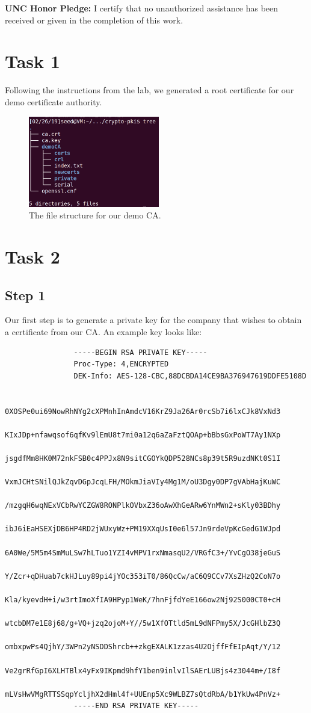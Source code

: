 \documentclass[12pt,letterpaper]{article}
\author{Chathan Driehuys}
\begin{document}
	\noindent \textbf{UNC Honor Pledge:} I certify that no unauthorized assistance has been received or given in the completion of this work.
	
	\vspace{.5in}
	
	\section*{Task 1}
		Following the instructions from the lab, we generated a root certificate for our demo certificate authority.
	
		\begin{figure}[h!]
			\begin{center}
				\includegraphics[width=2.25in]{task-1-files}
			\end{center}
			\caption{The file structure for our demo CA.}
		\end{figure}
	
	\section*{Task 2}
		\subsection*{Step 1}
			Our first step is to generate a private key for the company that wishes to obtain a certificate from our CA. An example key looks like:
			
			\begin{verbatim}
				-----BEGIN RSA PRIVATE KEY-----
				Proc-Type: 4,ENCRYPTED
				DEK-Info: AES-128-CBC,88DCBDA14CE9BA376947619DDFE5108D
				
				0XOSPe0ui69NowRhNYg2cXPMnhInAmdcV16KrZ9Ja26Ar0rcSb7i6lxCJk8VxNd3
				KIxJDp+nfawqsof6qfKv9lEmU8t7mi0a12q6aZaFztQOAp+bBbsGxPoWT7Ay1NXp
				jsgdfMm8HK0M72nkFSB0c4PPJx8N9sitCGOYkQDP528NCs8p39t5R9uzdNKt0S1I
				VxmJCHtSNilQJkZqvDGpJcqLFH/MOkmJiaVIy4Mg1M/oU3Dgy0DP7gVAbHajKuWC
				/mzgqH6wqNExVCbRwYCZGW8RONPlkOVbxZ36oAwXhGeARw6YnMWn2+sKly03BDhy
				ibJ6iEaHSEXjDB6HP4RD2jWUxyWz+PM19XXqUsI0e6l57Jn9rdeVpKcGedG1WJpd
				6A0We/5M5m4SmMuLSw7hLTuo1YZI4vMPV1rxNmasqU2/VRGfC3+/YvCgO38jeGuS
				Y/Zcr+qDHuab7ckHJLuy89pi4jYOc353iT0/86QcCw/aC6Q9CCv7XsZHzQ2CoN7o
				Kla/kyevdH+i/w3rtImoXfIA9HPyp1WeK/7hnFjfdYeE166ow2Nj92S000CT0+cH
				wtcbDM7e1E8j68/g+VQ+jzq2ojoM+Y//5w1XfOTtld5mL9dNFPmy5X/JcGHlbZ3Q
				ombxpwPs4QjhY/3WPn2yNSDDShrcb++zkgEXALK1zzas4U2OjffFfEIpAqt/Y/12
				Ve2grRfGpI6XLHTBlx4yFx9IKpmd9hfY1ben9inlvIlSAErLUBjs4z3044m+/I8f
				mLVsHwVMgRTTSSqpYcljhX2dHml4f+UUEnp5Xc9WLBZ7sQtdRbA/b1YkUw4PnVz+
				-----END RSA PRIVATE KEY-----
			\end{verbatim}
			
\end{document}
